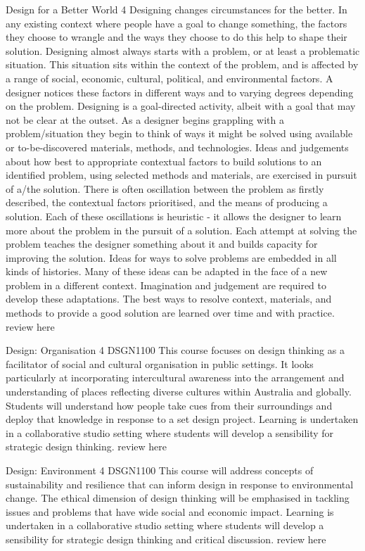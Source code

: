 	{Design for a Better World}
	{4}
	{}
	{}
	{}
	{Designing changes circumstances for the better. In any existing context where people have a goal to change something, the factors they choose to wrangle and the ways they choose to do this help to shape their solution. Designing almost always starts with a problem, or at least a problematic situation. This situation sits within the context of the problem, and is affected by a range of social, economic, cultural, political, and environmental factors. A designer notices these factors in different ways and to varying degrees depending on the problem. Designing is a goal-directed activity, albeit with a goal that may not be clear at the outset. As a designer begins grappling with a problem/situation they begin to think of ways it might be solved using available or to-be-discovered materials, methods, and technologies. Ideas and judgements about how best to appropriate contextual factors to build solutions to an identified problem, using selected methods and materials, are exercised in pursuit of a/the solution. There is often oscillation between the problem as firstly described, the contextual factors prioritised, and the means of producing a solution. Each of these oscillations is heuristic - it allows the designer to learn more about the problem in the pursuit of a solution. Each attempt at solving the problem teaches the designer something about it and builds capacity for improving the solution. Ideas for ways to solve problems are embedded in all kinds of histories. Many of these ideas can be adapted in the face of a new problem in a different context. Imagination and judgement are required to develop these adaptations. The best ways to resolve context, materials, and methods to provide a good solution are learned over time and with practice.}
	{review here}

	{Design: Organisation}
	{4}
	{DSGN1100}
	{}
	{}
	{This course focuses on design thinking as a facilitator of social and cultural organisation in public settings. It looks particularly at incorporating intercultural awareness into the arrangement and understanding of places reflecting diverse cultures within Australia and globally. Students will understand how people take cues from their surroundings and deploy that knowledge in response to a set design project. Learning is undertaken in a collaborative studio setting where students will develop a sensibility for strategic design thinking.}
	{review here}

	{Design: Environment}
	{4}
	{DSGN1100}
	{}
	{}
	{This course will address concepts of sustainability and resilience that can inform design in response to environmental change. The ethical dimension of design thinking will be emphasised in tackling issues and problems that have wide social and economic impact. Learning is undertaken in a collaborative studio setting where students will develop a sensibility for strategic design thinking and critical discussion.}
	{review here}

